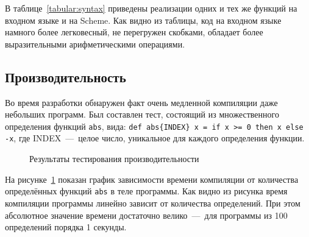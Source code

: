 \documentclass[12pt,a4paper,oneside]{extarticle}
\begin{document}
        В таблице~\ref{tabular:syntax} приведены реализации одних и тех же функций на входном языке и на Scheme.
        Как видно из таблицы, код на входном языке намного более легковесный, не перегружен скобками, обладает более выразительными арифметическими операциями.

    \clearpage

    \subsection{Производительность}
        \label{subsubsec:perfomance}
        Во время разработки обнаружен факт очень медленной компиляции даже небольших программ.
        Был составлен тест, состоящий из множественного определения функций \lstinline$abs$, вида: \lstinline$def abs{INDEX} x = if x >= 0 then x else -x$, где {INDEX}~---~целое число, уникальное для каждого определения функции.        
        \begin{figure}[h!]        
        \centering
        \caption{Результаты тестирования производительности}
        \label{pic:test}
        \end{figure}
        На рисунке~\ref{pic:test} показан график зависимости времени компиляции от количества определённых функций \lstinline$abs$ в теле программы. Как видно из рисунка время компиляции программы линейно зависит от количества определений. При этом абсолютное значение времени достаточно велико~---~для программы из 100 определений порядка 1 секунды.
\end{document}
